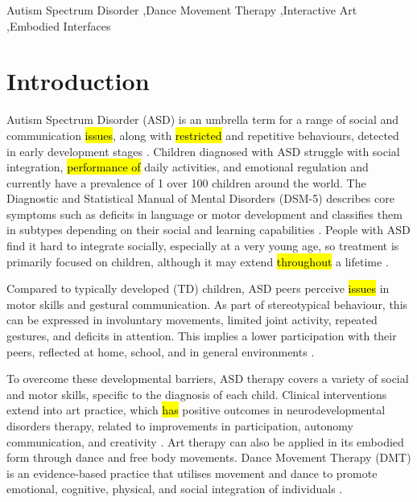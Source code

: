 \documentclass[a4paper,fleqn]{cas-sc}
\begin{document}

\fntext[1]{}

\begin{keywords}
Autism Spectrum Disorder \sep Dance Movement Therapy \sep Interactive Art \sep Embodied Interfaces
\end{keywords}

\maketitle
\section{Introduction} 
\label{sec1:intro}
Autism Spectrum Disorder (ASD) is an umbrella term for a range of social and communication \hl{issues}, along with \hl{restricted} and repetitive behaviours, detected in early development stages \cite{Lord20}. Children diagnosed with ASD struggle with social integration, \hl{performance of} daily activities, and emotional regulation \cite{Lord18} {and currently have a prevalence of 1 over 100 children} \cite{Zeidan22} around the world. The Diagnostic and Statistical Manual of Mental Disorders (DSM-5) describes core symptoms such as deficits in language or motor development and classifies them in subtypes depending on their social and learning capabilities \cite{DSM-5}. People with ASD find it hard to integrate socially, especially at a very young age, so treatment is primarily focused on children, although it may extend \hl{throughout} a lifetime \cite{Lord20}. 

Compared to typically developed (TD) children, ASD peers perceive \hl{issues} in motor skills and gestural communication. As part of stereotypical behaviour, this can be expressed in involuntary movements, limited joint activity, repeated gestures, and deficits in attention. This implies a lower participation with their peers, reflected at home, school, and in general environments \cite{Oliveira21}.

To overcome these developmental barriers, ASD therapy covers a variety of social and motor skills, specific to the diagnosis of each child. Clinical interventions extend into art practice, which \hl{has} positive outcomes in neurodevelopmental disorders therapy, related to improvements in participation, autonomy communication, and creativity \cite{Ortuño22}. Art therapy can also be applied in its embodied form through dance and free body movements. Dance Movement Therapy (DMT) is an evidence-based practice that utilises movement and dance to promote emotional, cognitive, physical, and social integration of individuals \cite{Crooks2021}.
\end{document}
